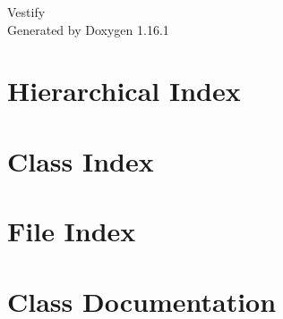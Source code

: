 \documentclass[twoside]{book}
\newcommand{\+}{\discretionary{\mbox{\scriptsize$\hookleftarrow$}}{}{}}
\newcommand{\clearemptydoublepage}{%
    \newpage{\pagestyle{empty}\cleardoublepage}%
  }
\begin{document}
  \raggedbottom
    \hypersetup{pageanchor=false,
                bookmarksnumbered=true,
                pdfencoding=unicode
               }
  \begin{titlepage}
  \vspace*{7cm}
  \begin{center}%
  {\Large Vestify}\\
  \vspace*{1cm}
  {\large Generated by Doxygen 1.16.1}\\
  \end{center}
  \end{titlepage}
  \clearemptydoublepage
  \tableofcontents
  \clearemptydoublepage
  \hypersetup{pageanchor=true}

\chapter{Hierarchical Index}

\chapter{Class Index}

\chapter{File Index}

\chapter{Class Documentation}


































\end{document}
